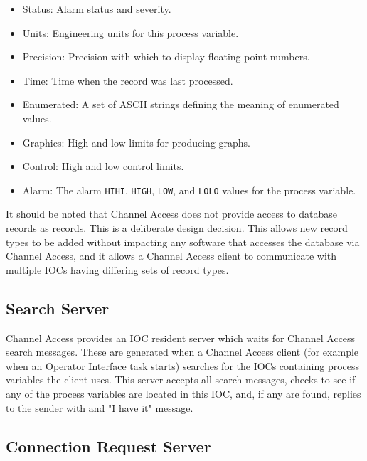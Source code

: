 \begin{itemize}\item Status:  Alarm status and severity.

\item Units:  Engineering units for this process variable.

\item Precision:  Precision with which to display floating point numbers.

\item Time:  Time when the record was last processed.

\item Enumerated:  A set of ASCII strings defining the meaning of enumerated values.

\item Graphics:  High and low limits for producing graphs.

\item Control:  High and low control limits.

\item Alarm:  The alarm \verb|HIHI|, \verb|HIGH|, \verb|LOW|, and \verb|LOLO| values for the process variable.

\end{itemize}It should be noted that Channel Access does not provide access to database records as records. This is a deliberate design 
decision. This allows new record types to be added without impacting any software that accesses the database via Channel 
Access, and it allows a Channel Access client to communicate with multiple IOCs having differing sets of record types.

\subsection{Search Server}

Channel Access provides an IOC resident server which waits for Channel Access search messages. These are generated 
when a Channel Access client (for example when an Operator Interface task starts) searches for the IOCs containing 
process variables the client uses. This server accepts all search messages, checks to see if any of the process variables are 
located in this IOC, and, if any are found, replies to the sender with and "I have it" message.

\subsection{Connection Request Server}

